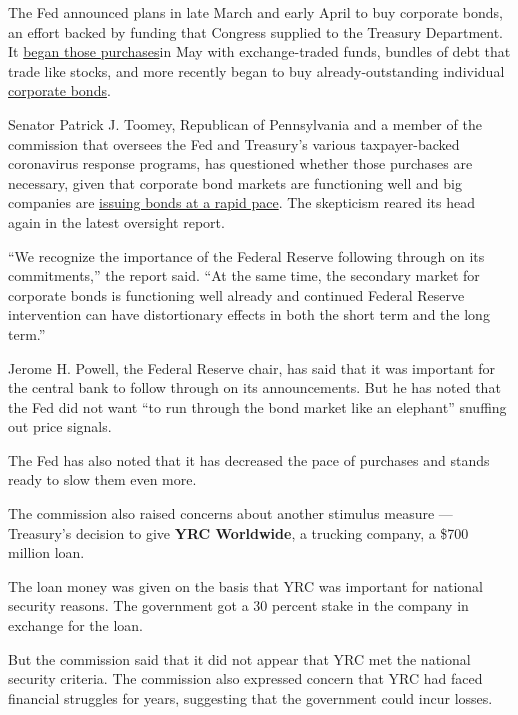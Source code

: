 The Fed announced plans in late March and early April to buy corporate
bonds, an effort backed by funding that Congress supplied to the
Treasury Department. It
\href{https://www.nytimes.com/2020/05/12/business/economy/fed-corporate-debt-coronavirus.html}{began
those purchases}in May with exchange-traded funds, bundles of debt that
trade like stocks, and more recently began to buy already-outstanding
individual
\href{https://www.nytimes.com/2020/06/30/business/economy/federal-reserve-jerome-powell-corporate-bonds.html}{corporate
bonds}.

Senator Patrick J. Toomey, Republican of Pennsylvania and a member of
the commission that oversees the Fed and Treasury's various
taxpayer-backed coronavirus response programs, has questioned whether
those purchases are necessary, given that corporate bond markets are
functioning well and big companies are
\href{https://www.nytimes.com/2020/07/20/business/corporate-debt-federal-reserve.html}{issuing
bonds at a rapid pace}. The skepticism reared its head again in the
latest oversight report.

``We recognize the importance of the Federal Reserve following through
on its commitments,'' the report said. ``At the same time, the secondary
market for corporate bonds is functioning well already and continued
Federal Reserve intervention can have distortionary effects in both the
short term and the long term.''

Jerome H. Powell, the Federal Reserve chair, has said that it was
important for the central bank to follow through on its announcements.
But he has noted that the Fed did not want ``to run through the bond
market like an elephant'' snuffing out price signals.

The Fed has also noted that it has decreased the pace of purchases and
stands ready to slow them even more.

The commission also raised concerns about another stimulus measure ---
Treasury's decision to give \textbf{YRC Worldwide}, a trucking company,
a \$700 million loan.

The loan money was given on the basis that YRC was important for
national security reasons. The government got a 30 percent stake in the
company in exchange for the loan.

But the commission said that it did not appear that YRC met the national
security criteria. The commission also expressed concern that YRC had
faced financial struggles for years, suggesting that the government
could incur losses.

